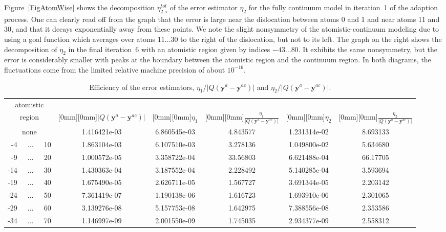 \documentclass[11pt,reqno,oneside]{amsart}
\numberwithin{equation}{section}
\begin{document}
Figure~\ref{FigAtomWise} shows the decomposition $\eta_{2,i}^{tot}$ of the error
estimator $\eta_2$ for the fully continuum model in iteration~1 of the adaption
process. One can clearly read off from the graph that the error is large near the
dislocation between atoms 0 and 1 and near atoms 11 and 30, and that it decays
exponentially away from these points. We note the slight
nonsymmetry of the atomistic-continuum modeling
due to using a goal function which averages over atoms $11\ldots30$ to the
right of the dislocation, but not to its left. The graph on the right shows the
decomposition of $\eta_2$ in the final iteration~6 with an atomistic region given by indices
$-43\dots80$. It exhibits the same nonsymmetry, but the error is considerably
smaller with peaks at the boundary between the atomistic region and the
continuum region.  In both diagrams, the fluctuations come from the limited
relative machine precision of about $10^{-16}$.

\begin{table}
\begin{tabular}{|r@{}c@{}l|c|c|c|c|c|}
\hline
\multicolumn{3}{|c|}{atomistic} &&&&& \\
\multicolumn{3}{|c|}{region}
& \raisebox{0.5em}[0mm][0mm]{$|Q({\mathbf{y}}^a-{\mathbf{y}}^{ac})|$}
& \raisebox{0.5em}[0mm][0mm]{$\eta_1$}
& \raisebox{0.7em}[0mm][0mm]{$\displaystyle \frac{\eta_1}{|Q({\mathbf{y}}^a-{\mathbf{y}}^{ac})|}$}
& \raisebox{0.5em}[0mm][0mm]{$\eta_2$}
& \raisebox{0.7em}[0mm][0mm]{$\displaystyle \frac{\eta_2}{|Q({\mathbf{y}}^a-{\mathbf{y}}^{ac})|}$} \\
\hline
\multicolumn{3}{|c|}{none}    & 1.416421e-03 & 6.860545e-03 & 4.843577 & 1.231314e-02 & 8.693133 \\
  -4 & $\:\:\ldots\:\:$ &  10 & 1.863104e-03 & 6.107510e-03 & 3.278136 & 1.049800e-02 & 5.634680 \\
  -9 & $\:\:\ldots\:\:$ &  20 & 1.000572e-05 & 3.358722e-04 & 33.56803 & 6.621488e-04 & 66.17705 \\
 -14 & $\:\:\ldots\:\:$ &  30 & 1.430363e-04 & 3.187552e-04 & 2.228492 & 5.140285e-04 & 3.593694 \\
 -19 & $\:\:\ldots\:\:$ &  40 & 1.675490e-05 & 2.626711e-05 & 1.567727 & 3.691344e-05 & 2.203142 \\
 -24 & $\:\:\ldots\:\:$ &  50 & 7.361419e-07 & 1.190138e-06 & 1.616723 & 1.693910e-06 & 2.301065 \\
 -29 & $\:\:\ldots\:\:$ &  60 & 3.139276e-08 & 5.157753e-08 & 1.642975 & 7.388556e-08 & 2.353586 \\
 -34 & $\:\:\ldots\:\:$ &  70 & 1.146997e-09 & 2.001550e-09 & 1.745035 & 2.934377e-09 & 2.558312 \\
\hline
\end{tabular}
\caption{\label{TabEfficiency} Efficiency of the error estimators, $\eta_1/|Q({\mathbf{y}}^a-{\mathbf{y}}^{ac})|$
  and $\eta_2/|Q({\mathbf{y}}^a-{\mathbf{y}}^{ac})|$.}
\end{table}
\end{document}
